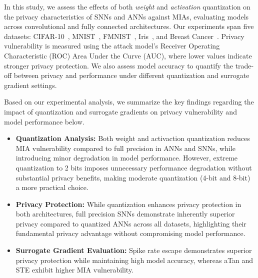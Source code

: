 In this study, we assess the effects of both \textit{weight} and \textit{activation} quantization on the privacy characteristics of SNNs and ANNs against MIAs, evaluating models across convolutional and fully connected architectures. Our experiments span five datasets: CIFAR-10~\cite{cifar10}, MNIST~\cite{lecun2010mnist}, FMNIST~\cite{xiao2017fashion}, Iris~\cite{omelina2021survey}, and Breast Cancer~\cite{misc_breast_cancer_14}. Privacy vulnerability is measured using the attack model’s Receiver Operating Characteristic (ROC) Area Under the Curve (AUC), where lower values indicate stronger privacy protection. We also assess model accuracy to quantify the trade-off between privacy and performance under different quantization and surrogate gradient settings.




Based on our experimental analysis, we summarize the key findings regarding the impact of quantization and surrogate gradients on privacy vulnerability and model performance below.

\begin{itemize}
    \item \textbf{Quantization Analysis:} Both weight and activaction quantization reduces MIA vulnerability compared to full precision in ANNs and SNNs, while introducing  minor degradation in model performance. However, extreme quantization to 2 bits imposes unnecessary performance degradation without substantial privacy benefits, making moderate quantization (4-bit and 8-bit) a more practical choice.

    \item \textbf{Privacy Protection:} While quantization enhances privacy protection in both architectures, full precision SNNs demonstrate inherently superior privacy compared to quantized ANNs across all datasets, highlighting their fundamental privacy advantage without compromising model performance.
    \item \textbf{Surrogate Gradient Evaluation:} Spike rate escape demonstrates superior privacy protection while maintaining high model accuracy, whereas  aTan and STE exhibit higher MIA vulnerability.
\end{itemize}


